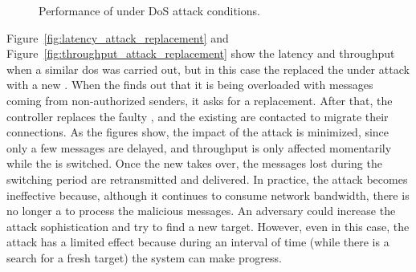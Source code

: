 \begin{figure}[t]
\hspace{-5mm}
\hspace{-5mm}
\caption{Performance of \sieveq under DoS attack conditions.}
\end{figure}


Figure~\ref{fig:latency_attack_replacement} and Figure~\ref{fig:throughput_attack_replacement} show the latency and throughput when a similar \gls{dos} was carried out, but in this case the \sieveq replaced the \presieve under attack with a new \presieve.
When the \presieve finds out that it is being overloaded with messages coming from non-authorized senders, it asks for a replacement.
After that, the controller replaces the faulty \presieve, and the existing \senders are contacted to migrate their connections.
As the figures show, the impact of the attack is minimized, since only a few messages are delayed, and throughput is only affected momentarily while the \presieve is switched.
Once the new \presieve takes over, the messages lost during the switching period are retransmitted and delivered.
In practice, the attack becomes ineffective because, although it continues to consume network bandwidth, there is no longer a \presieve to process the malicious messages.
An adversary could increase the attack sophistication and try to find a new \presieve target.
However, even in this case, the attack has a limited effect because during an interval of time (while there is a search for a fresh target) the system can make progress.

